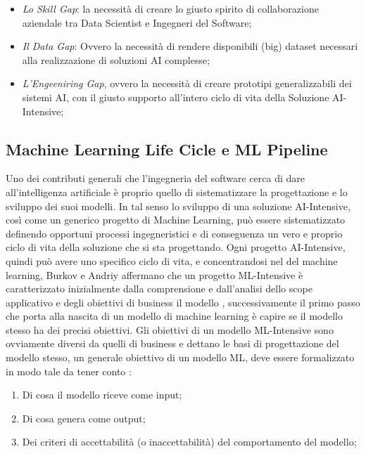 \begin{itemize}
    \item \emph{Lo Skill Gap}: la necessità di creare lo giusto spirito di collaborazione aziendale tra Data Scientist e Ingegneri del Software;
    \item \emph{Il Data Gap}: Ovvero la necessità di rendere disponibili (big) dataset necessari alla realizzazione di soluzioni AI complesse;
    \item \emph{L'Engeeniring Gap}, ovvero la necessità di creare prototipi generalizzabili dei sistemi AI, con il giusto supporto all'intero ciclo di vita della Soluzione AI-Intensive;
\end{itemize}


\subsection{Machine Learning Life Cicle e ML Pipeline}
Uno dei contributi generali che l'ingegneria del software cerca di dare all'intelligenza artificiale è proprio quello di sistematizzare la progettazione e lo sviluppo dei suoi modelli. In tal senso lo sviluppo di una soluzione AI-Intensive, così come un generico progetto di Machine Learning, può essere sistematizzato definendo opportuni processi ingegneristici e di conseguenza un vero e proprio ciclo di vita della soluzione che si sta progettando. Ogni progetto AI-Intensive, quindi può avere uno specifico ciclo di vita, e concentrandosi nel del machine learning, Burkov e Andriy affermano che un progetto ML-Intensive è caratterizzato inizialmente dalla comprensione e dall'analisi dello scope applicativo e degli obiettivi di business il modello \cite{burkov2020machine}, successivamente il primo passo che porta alla nascita di un modello di machine learning è capire se il modello stesso ha dei precisi obiettivi. Gli obiettivi di un modello ML-Intensive sono ovviamente diversi da quelli di business e dettano le basi di progettazione del modello stesso, un generale obiettivo di un modello ML, deve essere formalizzato in modo tale da tener conto \cite{burkov2020machine}:

\begin{enumerate}
    \item Di cosa il modello riceve come input;
    \item Di cosa genera come output;
    \item Dei criteri di accettabilità (o inaccettabilità) del comportamento del modello;
\end{enumerate}

